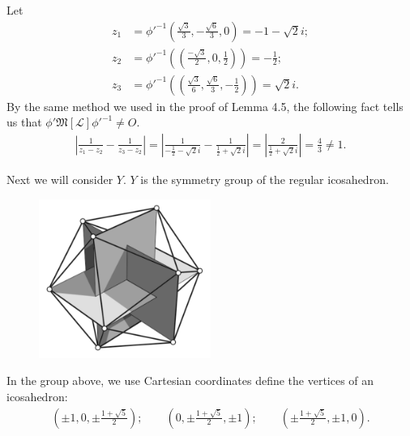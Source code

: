 \documentclass{amsart}
\newcommand{\LLL}{\mathcal L} %
\newcommand{\MMM}{\mathfrak M}
\begin{document}
Let
\begin{align*}
z_1 &= \phi'^{-1}( \frac{\sqrt{3}}{3}, -\frac{\sqrt{6}}{3}, 0 ) = -1 - \sqrt{2}i; \\
z_2 &= \phi'^{-1}((\frac{-\sqrt{3}}{2},0,\frac{1}{2})) = -\frac{1}{2};\\
z_3 &= \phi'^{-1}((\frac{\sqrt{3}}{6}, \frac{\sqrt{6}}{3}, -\frac{1}{2})) = \sqrt{2}i.
\end{align*}
By the same method we used in the proof of Lemma 4.5, the following fact tells us that $\phi' \MMM[\LLL] \phi'^{-1} \neq O$.
\begin{align*}
|\frac{1}{z_1 - z_2} - \frac{1}{z_3 - z_2}| = |\frac{1}{-\frac{1}{2} - \sqrt{2}i} - \frac{1}{\frac{1}{2}+ \sqrt{2}i}| = |\frac{2}{\frac{1}{2}+ \sqrt{2}i}| = \frac{4}{3} \neq 1.
\end{align*}

Next we will consider $Y$. $Y$ is the symmetry group of the regular icosahedron.

\begin{figure}[H]
\begin{center}
\includegraphics [width=0.5\textwidth]{Icosahedron.pdf}
\caption{}
\end{center}
\end{figure}

In the group above, we use Cartesian coordinates define the vertices of an icosahedron:
\begin{align*}
(\pm 1, 0 , \pm \frac{1 + \sqrt{5}}{2}); \qquad (0, \pm \frac{1 + \sqrt{5}}{2}, \pm 1); \qquad (\pm \frac{1 + \sqrt{5}}{2},\pm 1, 0).
\end{align*}
\end{document}
